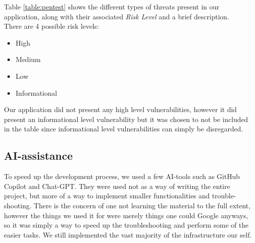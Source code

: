 \vspace{1cm}

Table \ref{table:pentest} shows the different types of threats present in our application, along with their associated \textit{Risk Level} and a brief description.\\
There are 4 possible risk levels:
\vspace{-0.2cm}
\begin{itemize}
    \itemsep -0.5em 
    \item High
    \item Medium
    \item Low
    \item Informational
\end{itemize}

Our application did not present any high level vulnerabilities, however it did present an informational level vulnerability but it was chosen to not be included in the table since informational level vulnerabilities can simply be disregarded.



\subsection*{AI-assistance}

To speed up the development process, we used a few AI-tools such as GitHub Copilot and Chat-GPT. They were used not as a way of writing the entire project, but more of a way to implement smaller functionalities and trouble-shooting. There is the concern of one not learning the material to the full extent, however the things we used it for were merely things one could Google anyways, so it was simply a way to speed up the troubleshooting and perform some of the easier tasks. We still implemented the vast majority of the infrastructure our self.